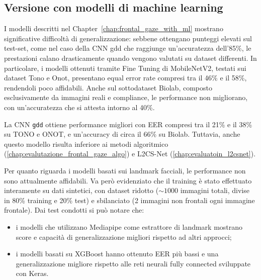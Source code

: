 \documentclass[12pt,a4paper,openright,twoside]{book}
\begin{document}
\subsection{Versione con modelli di machine learning}
I modelli descritti nel Chapter~\ref{chap:frontal_gaze_with_ml} mostrano significative difficoltà di generalizzazione: sebbene ottengano punteggi elevati sul test-set, come nel caso della CNN gdd che raggiunge un'accuratezza dell'85\%, le prestazioni calano drasticamente quando vengono valutati su dataset differenti. In particolare, i modelli ottenuti tramite Fine Tuning di MobileNetV2, testati sui dataset Tono e Onot, presentano equal error rate compresi tra il 46\% e il 58\%, rendendoli poco affidabili. Anche sul sottodataset Biolab, composto esclusivamente da immagini reali e compliance, le performance non migliorano, con un'accuratezza che si attesta intorno al 40\%.

La CNN \texttt{gdd} ottiene performance migliori con EER compresi tra il 21\% e il 38\% su TONO e ONOT, e un'accuracy di circa il 66\% su Biolab. Tuttavia, anche questo modello risulta inferiore ai metodi algoritmico (\ref{chap:evalutazione_frontal_gaze_algo}) e L2CS-Net (\ref{chap:evaluatoin_l2csnet}).  

Per quanto riguarda i modelli basati sui landmark facciali, le performance non sono attualmente affidabili. Va però evidenziato che il training è stato effettuato interamente su dati sintetici, con dataset ridotto (\(\sim1000\) immagini totali, divise in 80\% training e 20\% test) e sbilanciato (2 immagini non frontali ogni immagine frontale).
Dai test condotti si può notare che:
\begin{itemize}
    \item i modelli che utilizzano Mediapipe come estrattore di landmark mostrano score e capacità di generalizzazione migliori rispetto ad altri approcci;
    \item i modelli basati su XGBoost hanno ottenuto EER più bassi e una generalizzazione migliore rispetto alle reti neurali fully connected sviluppate con Keras.
\end{itemize}
\end{document}
